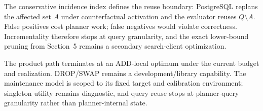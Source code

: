 The conservative incidence index defines the reuse boundary: PostgreSQL
replans the affected set $A$ under counterfactual activation and the evaluator
reuses $Q\setminus A$.  False positives cost planner work; false negatives
would violate correctness.  Incrementality therefore stops at query
granularity, and the exact lower-bound pruning from Section~5 remains a
secondary search-client optimization.

The product path terminates at an ADD-local optimum under the current budget
and realization.  DROP/SWAP remains a development/library capability.  The
maintenance model is scoped to its fixed target and calibration environment;
singleton utility remains diagnostic, and query reuse stops at planner-query
granularity rather than planner-internal state.
